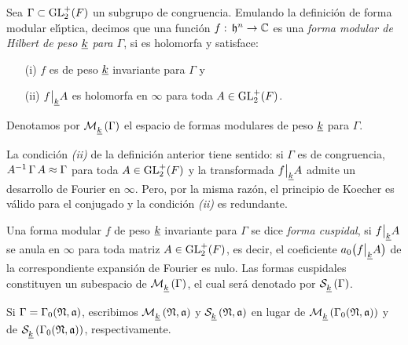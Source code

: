 \begin{defFormaModularDeHilbertParaCongruencia}%
	\label{def:formamodulardehilbertparacongruencia}
	Sea $\Gamma\subset\GLtp_{2}(F)$ un subgrupo de congruencia. Emulando la
	definici\'{o}n de forma modular el\'{\i}ptica, decimos que una
	funci\'{o}n $f:\,\hP^{n}\rightarrow\bb{C}$ es una
	\emph{forma modular de Hilbert de peso $\peso{k}$ para $\Gamma$}, si
	es holomorfa y satisface:
	\begin{itemize}
		\item[(i)] $f$ es de peso $\peso{k}$ invariante para $\Gamma$ y
		\item[(ii)] $f\operadormatrices{\peso{k}}{A}$ es holomorfa en
			$\infty$ para toda $A\in\GLtp_{2}(F)$.
	\end{itemize}
	Denotamos por $\modularH{k}{\Gamma}$ el espacio de formas modulares de
	peso $\peso{k}$ para $\Gamma$.
\end{defFormaModularDeHilbertParaCongruencia}

\begin{obsDefinicionFormasParaCongruencia}%
	\label{obs:definicionformasparacongruencia}
	La condici\'{o}n \textit{(ii)} de la definici\'{o}n anterior tiene
	sentido: si $\Gamma$ es de congruencia,
	$A^{-1}\,\Gamma\,A\conmensurable\Gamma$ para toda $A\in\GLtp_{2}(F)$ y
	la transformada $f\operadormatrices{\peso{k}}{A}$ admite un desarrollo
	de Fourier en $\infty$. Pero, por la misma raz\'{o}n, el principio de
	Koecher es v\'{a}lido para el conjugado y la condici\'{o}n
	\textit{(ii)} es redundante.
\end{obsDefinicionFormasParaCongruencia}

\begin{defFormaDeHilbertCuspidalParaCongruencia}%
	\label{def:formadehilbertcuspidalparacongruencia}
	Una forma modular $f$ de peso $\peso{k}$ invariante para $\Gamma$
	se dice \emph{forma cuspidal},
	si $f\operadormatrices{\peso{k}}{A}$ se anula en $\infty$ para toda
	matriz $A\in\GLtp_{2}(F)$, es decir, el coeficiente
	$a_{0}\big(f\operadormatrices{\peso{k}}{A}\big)$ de la
	correspondiente expansi\'{o}n de Fourier es nulo. Las formas cuspidales
	constituyen un subespacio de $\modularH{k}{\Gamma}$, el cual ser\'{a}
	denotado por $\spitzH{k}{\Gamma}$.
\end{defFormaDeHilbertCuspidalParaCongruencia}

Si $\Gamma=\Gamma_{0}(\frak{N},\frak{a})$, escribimos
$\modularH{k}{\frak{N},\frak{a}}$ y $\spitzH{k}{\frak{N},\frak{a}}$ en lugar de
$\modularH{k}{\Gamma_{0}(\frak{N},\frak{a})}$ y de
$\spitzH{k}{\Gamma_{0}(\frak{N},\frak{a})}$, respectivamente.

